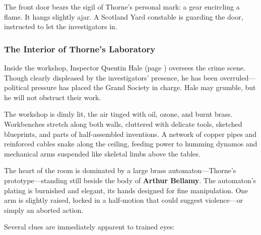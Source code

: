 The front door bears the sigil of Thorne’s personal mark: a gear encircling a flame. It hangs slightly ajar. A Scotland Yard constable is guarding the door, instructed to let the investigators in.

\subsubsection*{The Interior of Thorne's Laboratory}

Inside the workshop, Inspector Quentin Hale (page \pageref{npc:inspector-hale}) oversees the crime scene. Though clearly displeased by the investigators’ presence, he has been overruled—political pressure has placed the Grand Society in charge. Hale may grumble, but he will not obstruct their work.

The workshop is dimly lit, the air tinged with oil, ozone, and burnt brass. Workbenches stretch along both walls, cluttered with delicate tools, sketched blueprints, and parts of half-assembled inventions. A network of copper pipes and reinforced cables snake along the ceiling, feeding power to humming dynamos and mechanical arms suspended like skeletal limbs above the tables.

The heart of the room is dominated by a large brass automaton—Thorne’s prototype—standing still beside the body of \textbf{Arthur Bellamy}. The automaton’s plating is burnished and elegant, its hands designed for fine manipulation. One arm is slightly raised, locked in a half-motion that could suggest violence—or simply an aborted action.

Several clues are immediately apparent to trained eyes:

